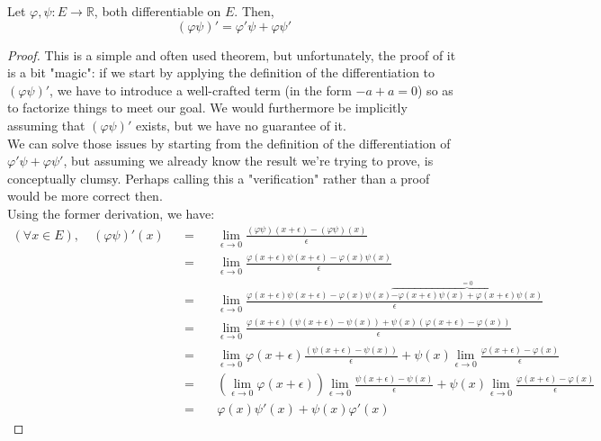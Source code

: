 \documentclass[solutions.tex]{subfiles}
\begin{document}
\begin{theorem} Let $\varphi, \psi : E \rightarrow \mathbb{R}$,
both differentiable on $E$. Then,
\[
	\boxed{(\varphi\psi)' = \varphi'\psi + \varphi\psi'}
\]
\end{theorem}
\begin{proof} This is a simple and often used theorem, but unfortunately,
the proof of it is a bit "magic": if we start by applying the definition
of the differentiation to $(\varphi\psi)'$, we have to introduce a well-crafted
term (in the form $-a+a=0$) so as to factorize things to meet our goal. We would
furthermore be implicitly assuming that $(\varphi\psi)'$ exists, but we have
no guarantee of it. \\

We can solve those issues by starting from the definition of the
differentiation of $\varphi'\psi + \varphi\psi'$, but assuming we already
know the result we're trying to prove, is conceptually clumsy. Perhaps
calling this a "verification" rather than a proof would be more correct
then. \\

Using the former derivation, we have:
\begin{equation*} \begin{aligned}
	(\forall x \in E),\quad(\varphi\psi)'(x) &&=\quad&
		\lim_{\epsilon \rightarrow 0}\frac{(\varphi\psi)(x+\epsilon)-(\varphi\psi)(x)}{\epsilon} \\
	~ &&=\quad &
		\lim_{\epsilon \rightarrow 0}\frac{\varphi(x+\epsilon)\psi(x+\epsilon)-\varphi(x)\psi(x)}{\epsilon} \\
	~ &&=\quad &
		\lim_{\epsilon \rightarrow 0}\frac{
			\varphi(x+\epsilon)\psi(x+\epsilon)-\varphi(x)\psi(x)
			\overbrace{-\varphi(x+\epsilon)\psi(x)
			+\varphi(x+\epsilon)\psi(x)}^{=0}
		}{\epsilon} \\
	~ &&=\quad &
		\lim_{\epsilon \rightarrow 0}\frac{
			\varphi(x+\epsilon)(\psi(x+\epsilon)-\psi(x))
			+
			\psi(x)(\varphi(x+\epsilon)-\varphi(x))
		}{\epsilon} \\
	~ &&=\quad &
		\lim_{\epsilon \rightarrow 0}\varphi(x+\epsilon)\frac{
			(\psi(x+\epsilon)-\psi(x))
		}{\epsilon}
		+
		\psi(x)\lim_{\epsilon \rightarrow 0}\frac{
			\varphi(x+\epsilon)-\varphi(x)
		}{\epsilon} \\
	~ &&=\quad &
		\left(\lim_{\epsilon \rightarrow 0}\varphi(x+\epsilon)\right)
		\lim_{\epsilon \rightarrow 0}\frac{
			\psi(x+\epsilon)-\psi(x)
		}{\epsilon}
		+
		\psi(x)\lim_{\epsilon \rightarrow 0}\frac{
			\varphi(x+\epsilon)-\varphi(x)
		}{\epsilon} \\
	~ &&=\quad & \boxed{\varphi(x)\psi'(x) + \psi(x)\varphi'(x)}
\end{aligned} \end{equation*}
\end{proof}
\end{document}
